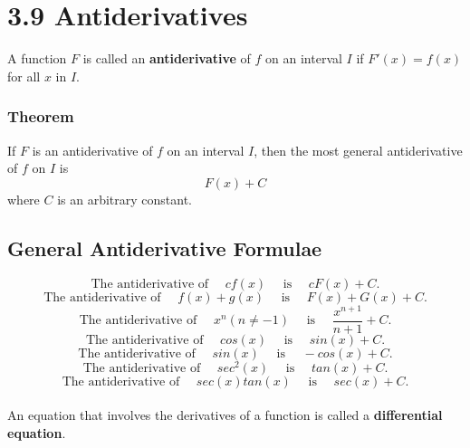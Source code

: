 %
%

\section*{3.9 Antiderivatives}

A function \(F\) is called an \textbf{antiderivative} of \(f\) on an interval \(I\) if \(F'(x)=f(x)\) for all \(x\) in \(I\).

\subsubsection*{Theorem}

If \(F\) is an antiderivative of \(f\) on an interval \(I\), then the most general antiderivative of \(f\) on \(I\) is 
$$ F(x) + C $$
where \(C\) is an arbitrary constant.

\subsection*{General Antiderivative Formulae}

$$ \text{The antiderivative of } \quad cf(x) \quad \text{ is } \quad cF(x) + C. $$
$$ \text{The antiderivative of } \quad f(x)+g(x) \quad \text{ is } \quad F(x) + G(x) + C. $$
$$ \text{The antiderivative of } \quad x^{n} (n \neq -1) \quad \text{ is } \quad \frac{x^{n+1}}{n+1} + C. $$
$$ \text{The antiderivative of } \quad cos(x) \quad \text{ is } \quad sin(x) + C. $$
$$ \text{The antiderivative of } \quad sin(x) \quad \text{ is } \quad -cos(x) + C. $$
$$ \text{The antiderivative of } \quad sec^2(x) \quad \text{ is } \quad tan(x) + C. $$
$$ \text{The antiderivative of } \quad sec(x)tan(x) \quad \text{ is } \quad sec(x) + C. $$
\\
An equation that involves the derivatives of a function is called a \textbf{differential equation}.
